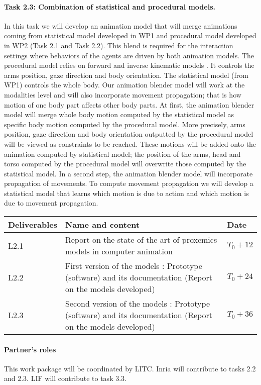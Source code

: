 \paragraph{Task 2.3:  Combination of statistical and procedural models.}

In this task we will develop an animation model that will merge animations coming from statistical model developed in WP1 and procedural model developed in WP2 (Task 2.1 and Task 2.2). This blend is required for the interaction settings where behaviors of the agents are driven by both animation models.  The procedural model relies on forward and inverse kinematic models \cite{huang:2012:EET}. It controls the arms position, gaze direction and body orientation. The statistical model (from WP1) controls the whole body.  Our animation blender model will work at the modalities level and will also incorporate movement propagation; that is how motion of one body part affects other body parts. At first, the animation blender model will merge whole body motion computed by the statistical model as specific body motion computed by the procedural model. More precisely, arms position, gaze direction and body orientation outputted by the procedural model will be viewed as constraints to be reached. These motions will be added onto the animation computed by statistical model; the position of the arms, head and torso computed by the procedural model will overwrite those computed by the statistical model. In a second step, the animation blender model will incorporate propagation of movements. To compute movement propagation we will develop a statistical model that learns which motion is due to action and which motion is due to movement propagation.

\vspace{5mm}

\begin{tabular}{|l|p{10cm}|l|}\hline
Deliverables & Name and content  & Date  \\\hline
L2.1  & Report on the state of the art of proxemics models in computer animation&   $T_0+12$  \\\hline
L2.2  &  First version of the models : Prototype (software) and its documentation (Report on the models developed) & $T_0+24$ \\\hline
L2.3  &  Second version of the models : Prototype (software) and its documentation (Report on the models developed) &  $T_0+36$ \\\hline
\end{tabular}

\paragraph{Partner's roles} This work package  will be coordinated by LITC. Inria  will contribute to tasks 2.2 and 2.3. LIF will contribute to task 3.3.
 
\endinput
